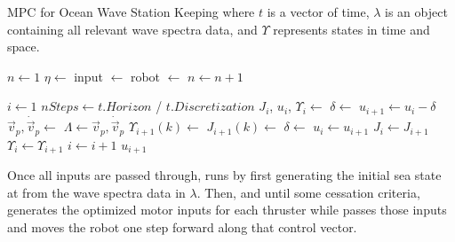 \documentclass[letterpaper, 10 pt, conferences]{ieeeconf}  %
\begin{document}
\begin{algorithm}
\caption[caption]{MPC for Ocean Wave Station Keeping \hspace{\textwidth}where $t$ is a vector of time, $\lambda$ is an object containing all relevant wave spectra data, and $\Upsilon$ represents states in time and space.}
\label{alg:MPC}
\begin{algorithmic}[1]

 
\State $n\gets1$
\State $\eta \gets$ 
\State input $\gets$  
\State robot $\gets$  
\State $n \gets n+1$
\EndWhile
\EndProcedure

\State $i \gets 1$
\State $nSteps \gets t.Horizon$ / $t.Discretization$
\State $J_i$, $u_i$, $\Upsilon_i \gets$ 
\State $\delta \gets$  
\State $u_{i+1} \gets u_{i} - \delta$
\State $\vec{v}_p, \dot{\vec{v}}_p \gets$ 
\State $\Lambda \gets \vec{v}_p, \dot{\vec{v}}_p$
\State $\Upsilon_{i+1}(k) \gets$ 
\State $J_{i+1}(k) \gets$ 
\EndFor
\State $\delta \gets$ 
\State $u_i \gets u_{i+1}$
\State $J_i \gets J_{i+1}$
\State $\Upsilon_i \gets \Upsilon_{i+1}$
\State $i \gets i+1$
\EndWhile
\State \Return $u_{i+1}$
\EndFunction

\end{algorithmic}
\end{algorithm}

Once all inputs are passed through,  runs by first generating the initial sea state at  from the wave spectra data in $\lambda$. Then, and until some cessation criteria,  generates the optimized motor inputs for each thruster while  passes those inputs and moves the robot one step forward along that control vector. 
\end{document}
